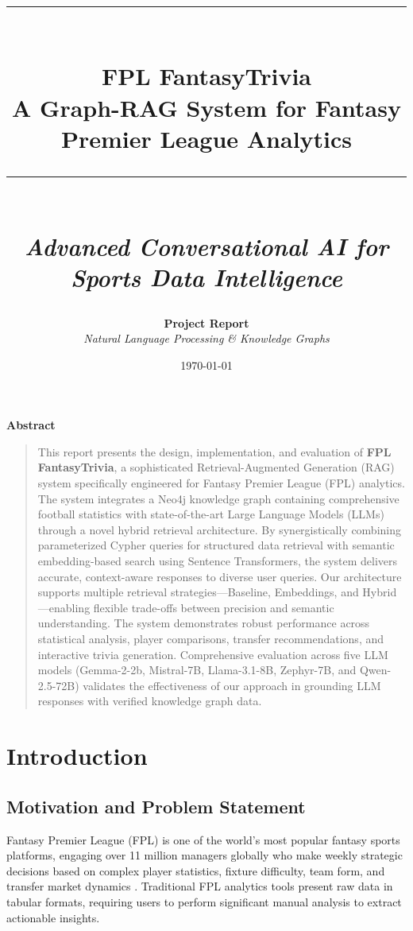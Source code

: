 \documentclass[11pt, a4paper]{article}
\title{%
    \vspace{-1cm}
    \textcolor{deepblue}{\rule{\textwidth}{2pt}}\\[0.8em]
    \textbf{\LARGE FPL FantasyTrivia}\\[0.3em]
    \textbf{\Large A Graph-RAG System for Fantasy Premier League Analytics}\\[0.5em]
    \textcolor{deepblue}{\rule{\textwidth}{1pt}}\\[1em]
    \large\textit{Advanced Conversational AI for Sports Data Intelligence}
}
\author{%
    \textbf{Project Report}\\[0.5em]
    \textit{Natural Language Processing \& Knowledge Graphs}
}
\date{\today}
\renewenvironment{abstract}{%
    \begin{center}
    \textbf{\large\color{deepblue}Abstract}
    \end{center}
    \begin{quotation}
    \small
}{%
    \end{quotation}
}
\begin{document}
\maketitle
\newpage

\begin{abstract}
This report presents the design, implementation, and evaluation of \textbf{FPL FantasyTrivia}, a sophisticated Retrieval-Augmented Generation (RAG) system specifically engineered for Fantasy Premier League (FPL) analytics. The system integrates a Neo4j knowledge graph containing comprehensive football statistics with state-of-the-art Large Language Models (LLMs) through a novel hybrid retrieval architecture. By synergistically combining parameterized Cypher queries for structured data retrieval with semantic embedding-based search using Sentence Transformers, the system delivers accurate, context-aware responses to diverse user queries. Our architecture supports multiple retrieval strategies---Baseline, Embeddings, and Hybrid---enabling flexible trade-offs between precision and semantic understanding. The system demonstrates robust performance across statistical analysis, player comparisons, transfer recommendations, and interactive trivia generation. Comprehensive evaluation across five LLM models (Gemma-2-2b, Mistral-7B, Llama-3.1-8B, Zephyr-7B, and Qwen-2.5-72B) validates the effectiveness of our approach in grounding LLM responses with verified knowledge graph data.
\end{abstract}
\newpage

\tableofcontents
\newpage

\section{Introduction}

\subsection{Motivation and Problem Statement}
Fantasy Premier League (FPL) is one of the world's most popular fantasy sports platforms, engaging over 11 million managers globally who make weekly strategic decisions based on complex player statistics, fixture difficulty, team form, and transfer market dynamics \cite{fpl_official}. Traditional FPL analytics tools present raw data in tabular formats, requiring users to perform significant manual analysis to extract actionable insights.
\end{document}
